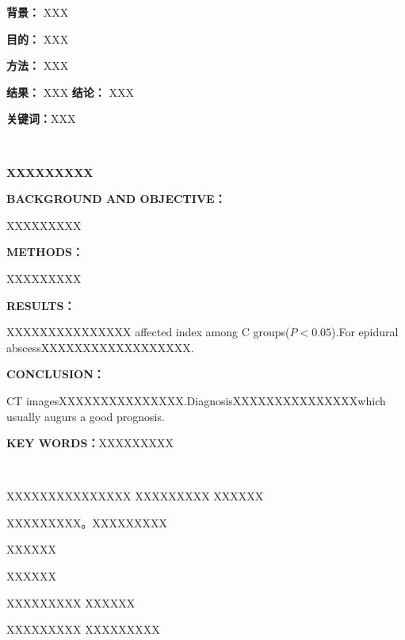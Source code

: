 
\textbf{背景：}
XXX

\textbf{目的：}
XXX

\textbf{方法：}
XXX

\textbf{结果：}
XXX
\textbf{结论：}
XXX

\textbf{关键词：}XXX

\newpage
~~~\vspace{1em}


\begin{flushleft}
\sihao	\textbf{XXXXXXXXX}
\end{flushleft}


\textbf{BACKGROUND AND OBJECTIVE：}

XXXXXXXXX


\textbf{METHODS：}


XXXXXXXXX


\textbf{RESULTS：}

XXXXXXXXXXXXXXX affected index among C groups($P<0.05$).For epidural abscessXXXXXXXXXXXXXXXXXX.


\textbf{CONCLUSION：}


CT imagesXXXXXXXXXXXXXXX.DiagnosisXXXXXXXXXXXXXXXwhich usually augurs a good prognosis. 


\textbf{KEY WORDS：}XXXXXXXXX

\newpage
~~~\vspace{1em}




XXXXXXXXXXXXXXX
XXXXXXXXX
XXXXXX

XXXXXXXXX。XXXXXXXXX



XXXXXX

XXXXXX

XXXXXXXXX
XXXXXX

XXXXXXXXX
XXXXXXXXX


